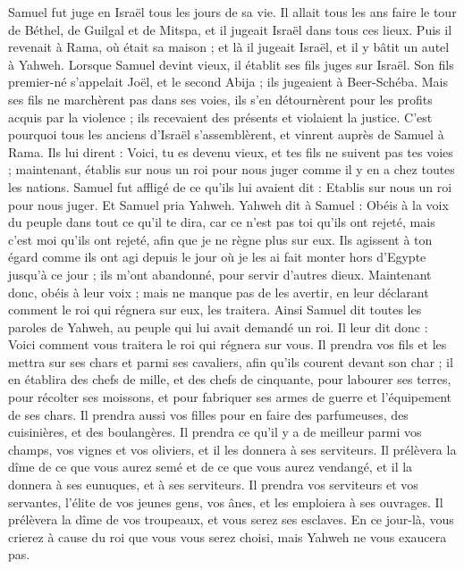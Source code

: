 \begin{multicols}{2}
Samuel fut juge en Israël tous les jours de sa vie.
Il allait tous les ans faire le tour de Béthel, de Guilgal et de Mitspa, et il jugeait Israël dans tous ces lieux.
Puis il revenait à Rama, où était sa maison ; et là il jugeait Israël, et il y bâtit un autel à Yahweh.
\VerseOne{}Lorsque Samuel devint vieux, il établit ses fils juges sur Israël.
Son fils premier-né s’appelait Joël, et le second Abija ; ils jugeaient à Beer-Schéba.
Mais ses fils ne marchèrent pas dans ses voies, ils s’en détournèrent pour les profits acquis par la violence ; ils recevaient des présents et violaient la justice.
C'est pourquoi tous les anciens d'Israël s'assemblèrent, et vinrent auprès de Samuel à Rama.
Ils lui dirent : Voici, tu es devenu vieux, et tes fils ne suivent pas tes voies ; maintenant, établis sur nous un roi pour nous juger comme il y en a chez toutes les nations.
Samuel fut affligé de ce qu'ils lui avaient dit : Etablis sur nous un roi pour nous juger. Et Samuel pria Yahweh.
Yahweh dit à Samuel : Obéis à la voix du peuple dans tout ce qu'il te dira, car ce n'est pas toi qu'ils ont rejeté, mais c'est moi qu'ils ont rejeté, afin que je ne règne plus sur eux.
Ils agissent à ton égard comme ils ont agi depuis le jour où je les ai fait monter hors d'Egypte jusqu’à ce jour ; ils m’ont abandonné, pour servir d'autres dieux.
Maintenant donc, obéis à leur voix ; mais ne manque pas de les avertir, en leur déclarant comment le roi qui régnera sur eux, les traitera.
Ainsi Samuel dit toutes les paroles de Yahweh, au peuple qui lui avait demandé un roi.
Il leur dit donc : Voici comment vous traitera le roi qui régnera sur vous. Il prendra vos fils et les mettra sur ses chars et parmi ses cavaliers, afin qu’ils courent devant son char ;
il en établira des chefs de mille, et des chefs de cinquante, pour labourer ses terres, pour récolter ses moissons, et pour fabriquer ses armes de guerre et l’équipement de ses chars.
Il prendra aussi vos filles pour en faire des parfumeuses, des cuisinières, et des boulangères.
Il prendra ce qu’il y a de meilleur parmi vos champs, vos vignes et vos oliviers, et il les donnera à ses serviteurs.
Il prélèvera la dîme de ce que vous aurez semé et de ce que vous aurez vendangé, et il la donnera à ses eunuques, et à ses serviteurs.
Il prendra vos serviteurs et vos servantes, l'élite de vos jeunes gens, vos ânes, et les emploiera à ses ouvrages.
Il prélèvera la dîme de vos troupeaux, et vous serez ses esclaves.
En ce jour-là, vous crierez à cause du roi que vous vous serez choisi, mais Yahweh ne vous exaucera pas.

\end{multicols}
